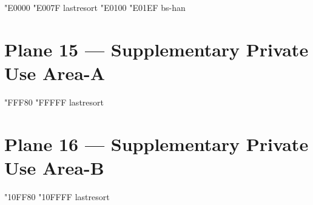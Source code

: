 \documentclass{article}
\begin{document}
                                           { "E0000} { "E007F} {lastresort}
                 { "E0100} { "E01EF} {bs-han}

\section{Plane 15 --- Supplementary Private Use Area-A}

               { "FFF80} { "FFFFF} {lastresort}

\section{Plane 16 --- Supplementary Private Use Area-B}

               {"10FF80} {"10FFFF} {lastresort}
\end{document}
